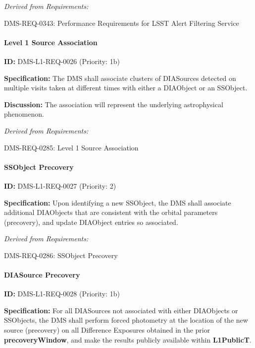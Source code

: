 \documentclass[SE,toc,lsstdraft]{lsstdoc}
\begin{document}
\emph{Derived from Requirements:}

DMS-REQ-0343:
Performance Requirements for LSST Alert Filtering Service \newline

\paragraph{Level 1 Source Association}\hfill  %

\label{DMS-L1-REQ-0026}
\textbf{ID:} DMS-L1-REQ-0026 (Priority: 1b)

\textbf{Specification:} The DMS shall associate clusters of DIASources detected on multiple visits taken at different times with either a DIAObject or an SSObject.

\textbf{Discussion: }The association will represent the underlying astrophysical phenomenon.

\emph{Derived from Requirements:}

DMS-REQ-0285:
Level 1 Source Association \newline

\paragraph{SSObject Precovery}\hfill  %

\label{DMS-L1-REQ-0027}
\textbf{ID:} DMS-L1-REQ-0027 (Priority: 2)

\textbf{Specification:} Upon identifying a new SSObject, the DMS shall associate additional DIAObjects that are consistent with the orbital parameters (precovery), and update DIAObject entries so associated.

\emph{Derived from Requirements:}

DMS-REQ-0286:
SSObject Precovery \newline

\paragraph{DIASource Precovery}\hfill  %

\label{DMS-L1-REQ-0028}
\textbf{ID:} DMS-L1-REQ-0028 (Priority: 1b)

\textbf{Specification:} For all DIASources not associated with either DIAObjects or SSObjects, the DMS shall perform forced photometry at the location of the new source (precovery) on all Difference Exposures obtained in the prior \textbf{precoveryWindow}, and make the results publicly available within \textbf{L1PublicT}.
\end{document}
